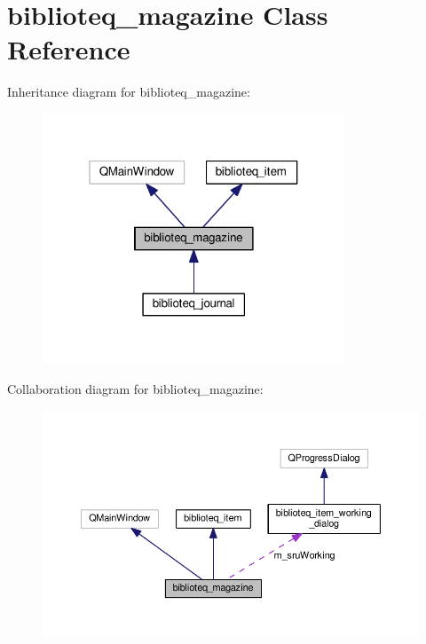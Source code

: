 \hypertarget{classbiblioteq__magazine}{}\section{biblioteq\+\_\+magazine Class Reference}
\label{classbiblioteq__magazine}


Inheritance diagram for biblioteq\+\_\+magazine\+:
\nopagebreak
\begin{figure}[H]
\begin{center}
\leavevmode
\includegraphics[width=256pt]{classbiblioteq__magazine__inherit__graph}
\end{center}
\end{figure}


Collaboration diagram for biblioteq\+\_\+magazine\+:
\nopagebreak
\begin{figure}[H]
\begin{center}
\leavevmode
\includegraphics[width=350pt]{classbiblioteq__magazine__coll__graph}
\end{center}
\end{figure}
